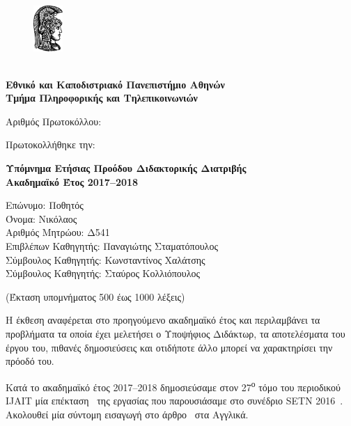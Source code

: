 \documentclass[a4paper]{article}
\begin{document}

\begin{figure}
  \includegraphics[width=3em]{athena}
\end{figure}
\textbf{\\[0.1em]
        Εθνικό και Καποδιστριακό Πανεπιστήμιο Αθηνών
        \\[0.5em]
        Τμήμα Πληροφορικής και Τηλεπικοινωνιών
        \\[1em]}

\noindent
Αριθμός Πρωτοκόλλου:

\noindent
Πρωτοκολλήθηκε την:

\vspace{1.3em}

\begin{center}
  \textbf{Υπόμνημα Ετήσιας Προόδου Διδακτορικής Διατριβής
          \\[0.5em]
          Ακαδημαϊκό Έτος 2017–2018}
\end{center}

\vspace{1em}

\noindent
Επώνυμο: Ποθητός \\
Όνομα: Νικόλαος \\
Αριθμός Μητρώου: Δ541 \\
Επιβλέπων Καθηγητής: Παναγιώτης Σταματόπουλος \\
Σύμβουλος Καθηγητής: Κωνσταντίνος Χαλάτσης \\
Σύμβουλος Καθηγητής: Σταύρος Κολλιόπουλος

\begin{center}
  (Έκταση υπομνήματος 500 έως 1000 λέξεις)
\end{center}

Η έκθεση αναφέρεται στο προηγούμενο ακαδημαϊκό έτος και
περιλαμβάνει τα προβλήματα τα οποία έχει μελετήσει ο
Υποψήφιος Διδάκτωρ, τα αποτελέσματα του έργου του, πιθανές
δημοσιεύσεις και οτιδήποτε άλλο μπορεί να χαρακτηρίσει την
πρόοδό του.

\vspace{1em}

Κατά το ακαδημαϊκό έτος 2017–2018 δημοσιεύσαμε στον
27\textsuperscript{ο} τόμο του περιοδικού IJAIT μία
επέκταση~\cite{Pothitos2018} της εργασίας που παρουσιάσαμε
στο συνέδριο SETN 2016~\cite{Pothitos2016-PoPS}. Ακολουθεί
μία σύντομη εισαγωγή στο άρθρο~\cite{Pothitos2018} στα
Αγγλικά.
\end{document}
